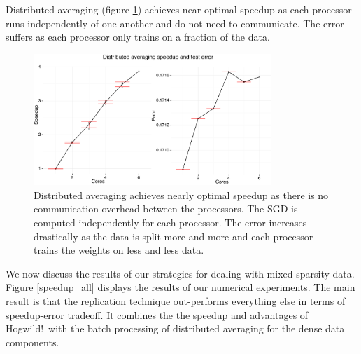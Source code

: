 \documentclass{article} %
\begin{document}
Distributed averaging (figure \ref{dist_avg}) achieves near optimal speedup as each processor runs independently of one another and do not need to communicate. The error suffers as each processor only trains on a fraction of the data.

\begin{figure}[H]
\centering
\includegraphics[width=0.8\textwidth]{../../dist_avg.pdf}
\caption{Distributed averaging achieves nearly optimal speedup as there is no communication overhead between the processors. The SGD is computed independently for each processor. The error increases drastically as the data is split more and more and each processor trains the weights on less and less data.}
\label{dist_avg}
\end{figure}

We now discuss the results of our strategies for dealing with mixed-sparsity data. Figure \ref{speedup_all} displays the results of our numerical experiments. The main result is that the replication technique out-performs everything else in terms of speedup-error tradeoff. It combines the the speedup and advantages of Hogwild!~with the batch processing of distributed averaging for the dense data components.
\end{document}
